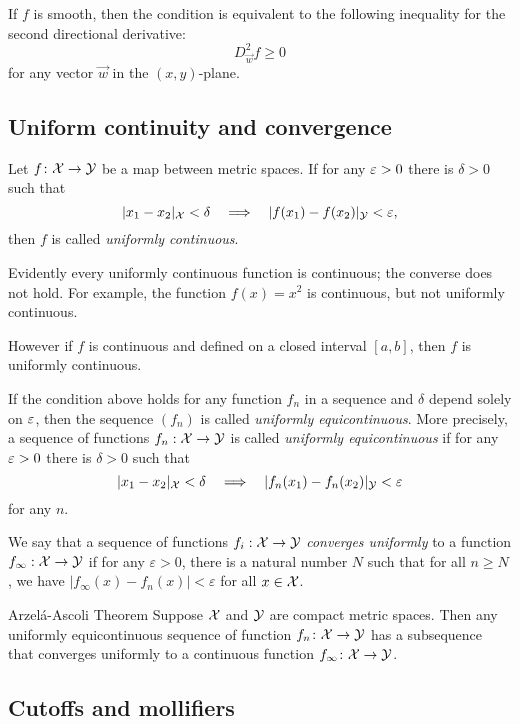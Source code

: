 If $f$ is smooth, then the condition is equivalent to the following inequality for the second directional derivative:
\[D^2_{\vec w}f\ge 0\]
for any vector $\vec w$ in the $(x,y)$-plane.

\subsection*{Uniform continuity and convergence}

Let $f\colon{\mathcal{X}}\to \mathcal{Y}$ be a map between metric spaces.
If  for any $\varepsilon>0$ there is $\delta>0$ such that 
\[|x_1-x_2|_{\mathcal{X}}<\delta\quad\Longrightarrow\quad |f(x_1)-f(x_2)|_\mathcal{Y}<\varepsilon,\]
then $f$ is called \emph{uniformly continuous}.

Evidently every uniformly continuous function is continuous;
the converse does not hold.
For example, the function $f(x)=x^2$ is continuous, but not uniformly continuous.

However if $f$ is continuous and defined on a closed interval $[a,b]$, then $f$ is uniformly continuous.

If the condition above holds for any function $f_n$ in a sequence and $\delta$ depend solely on $\varepsilon$,
then the sequence $(f_n)$ is called \emph{uniformly equicontinuous}.
More precisely, 
a sequence of functions $f_n:{\mathcal{X}}\to \mathcal{Y}$ is called {}\emph{uniformly equicontinuous} if 
for any $\varepsilon>0$ there is $\delta>0$ such that 
\[|x_1-x_2|_{\mathcal{X}}<\delta\quad\Longrightarrow\quad |f_n(x_1)-f_n(x_2)|_\mathcal{Y}<\varepsilon\]
for any $n$.


We say that a sequence of functions $f_i : {\mathcal{X}} \to \mathcal{Y}$ \emph{converges uniformly} to a function $f_{\infty}: {\mathcal{X}} \to \mathcal{Y}$ if for any 
$\varepsilon >0$, there is a natural number $N$ such that for all $n \geq N$, we have $| f_{\infty} (x)- f_n (x) | < \varepsilon$
for all $x  \in {\mathcal{X}}$.

\begin{thm}{Arzel\'{a}-Ascoli Theorem}\label{lem:equicontinuous}
Suppose $\mathcal{X}$ and $\mathcal{Y}$ are compact metric spaces. 
Then any uniformly equicontinuous sequence of function $f_n\colon\mathcal{X}\to \mathcal{Y}$ has a subsequence that converges uniformly to a continuous function $f_\infty\colon\mathcal{X}\to \mathcal{Y}$. 
\end{thm}

\subsection*{Cutoffs and mollifiers}

